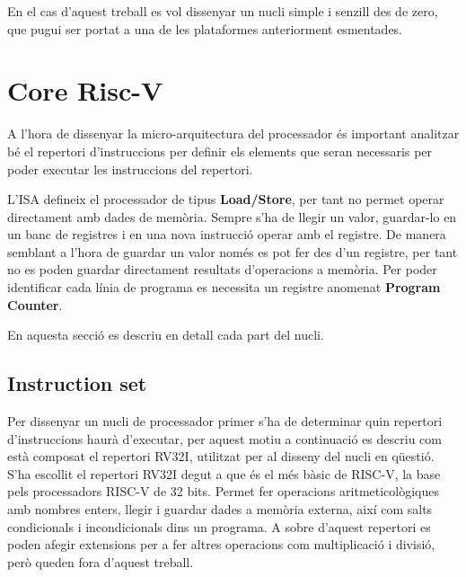 \documentclass[10pt,a4paper,twocolumn,twoside]{article}
\begin{document}
En el cas d'aquest treball es vol dissenyar un nucli simple i senzill des de zero, que pugui ser portat a una de les plataformes anteriorment esmentades.

\section{Core Risc-V}
\label{sec:Core}
    A l'hora de dissenyar la micro-arquitectura del processador és important analitzar bé el repertori d'instruccions per definir els elements que seran necessaris per poder executar les instruccions del repertori.
    
    L'ISA defineix el processador de tipus \textbf{Load/Store}, per tant no permet operar directament amb dades de memòria. 
    Sempre s'ha de llegir un valor, guardar-lo en un banc de registres i en una nova instrucció operar amb el registre.
    De manera semblant a l'hora de guardar un valor només es pot fer des d'un registre, per tant no es poden guardar directament resultats d'operacions a memòria.
    Per poder identificar cada línia de programa es necessita un registre anomenat\textbf{ Program Counter}.

En aquesta secció es descriu en detall cada part del nucli. 
    \subsection{Instruction set}
    Per dissenyar un nucli de processador primer s'ha de determinar quin repertori d'instruccions haurà d'executar, per aquest motiu a continuació es descriu com està composat el repertori RV32I, utilitzat per al disseny del nucli en qüestió.
    S'ha escollit el repertori RV32I degut a que és el més bàsic de RISC-V, la base pels processadors RISC-V de 32 bits. Permet fer operacions aritmeticològiques amb nombres enters, llegir i guardar dades a memòria externa, així com salts condicionals i incondicionals dins un programa. A sobre d'aquest repertori es poden afegir extensions per a fer altres operacions com multiplicació i divisió, però queden fora d'aquest treball. 
        
    
    
\end{document}
